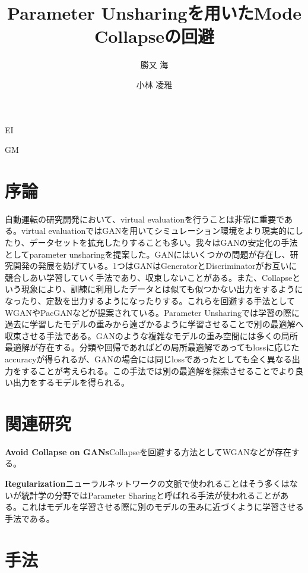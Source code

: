 \documentclass[techrep, submit, noauthor,preface]{ipsj}
\begin{document}
\title{Parameter Unsharingを用いたMode Collapseの回避}


\author{勝又 海}{}{EI}
\author{小林 凌雅}{}{GM}

\maketitle
\thispagestyle{empty} 
\section{序論}

自動運転の研究開発において、virtual evaluationを行うことは非常に重要である。virtual evaluationではGANを用いてシミュレーション環境をより現実的にしたり、データセットを拡充したりすることも多い。我々はGANの安定化の手法としてparameter unsharingを提案した。GANにはいくつかの問題が存在し、研究開発の発展を妨げている。1つはGANはGeneratorとDiscriminatorがお互いに競合しあい学習していく手法であり、収束しないことがある。また、Collapseという現象により、訓練に利用したデータとは似ても似つかない出力をするようになったり、定数を出力するようになったりする。これらを回避する手法としてWGANやPacGANなどが提案されている。Parameter Unsharingでは学習の際に過去に学習したモデルの重みから遠ざかるように学習させることで別の最適解へ収束させる手法である。GANのような複雑なモデルの重み空間には多くの局所最適解が存在する。分類や回帰であればどの局所最適解であってもlossに応じたaccuracyが得られるが、GANの場合には同じlossであったとしても全く異なる出力をすることが考えられる。この手法では別の最適解を探索させることでより良い出力をするモデルを得られる。

\section{関連研究}

{\bf Avoid Collapse on GANs}Collapseを回避する方法としてWGANなどが存在する。

{\bf Regularization}ニューラルネットワークの文脈で使われることはそう多くはないが統計学の分野ではParameter Sharing\cite{deeplearningbook}と呼ばれる手法が使われることがある。これはモデルを学習させる際に別のモデルの重みに近づくように学習させる手法である。

\section{手法}
\end{document}
